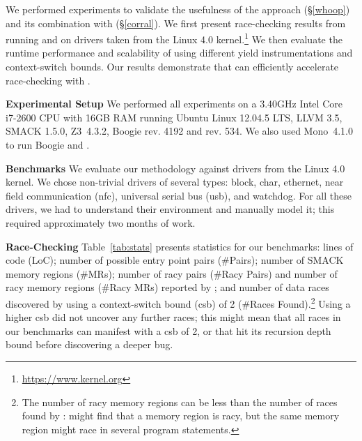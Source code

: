 We performed experiments to validate the usefulness of the \whoop approach (\S\ref{whoop}) and its combination with \corral (\S\ref{corral}). We first present race-checking results from running \whoop and \corral on \sizeOfBenchmarks drivers taken from the Linux 4.0 kernel.\footnote{\url{https://www.kernel.org}} We then evaluate the runtime performance and scalability of \corral using different yield instrumentations and context-switch bounds. Our results demonstrate that \whoop can efficiently accelerate race-checking with \corral.



\noindent\textbf{Experimental Setup }
%
We performed all experiments on a 3.40GHz Intel Core i7-2600 CPU with 16GB RAM running Ubuntu Linux 12.04.5 LTS, LLVM 3.5, SMACK 1.5.0, Z3~4.3.2, Boogie rev. 4192 and \corral rev. 534. We also used Mono~4.1.0 to run Boogie and \corral.

\noindent\textbf{Benchmarks }
%
We evaluate our methodology against \sizeOfBenchmarks drivers from the Linux 4.0 kernel. We chose non-trivial drivers of several types: block, char, ethernet, near field communication (nfc), universal serial bus (usb), and watchdog. For all these drivers, we had to understand their environment and manually model it; this required approximately two months of work.

\noindent\textbf{Race-Checking }
%
Table~\ref{tab:stats} presents statistics for our benchmarks: lines of code (LoC); number of possible entry point pairs (\#Pairs); number of SMACK memory regions (\#MRs); number of racy pairs (\#Racy Pairs) and number of racy memory regions (\#Racy MRs) reported by \whoop; and number of data races discovered by \corral using a context-switch bound (csb) of 2 (\#Races Found).\footnote{The number of racy memory regions can be less than the number of races found by \corral: \whoop might find that a memory region is racy, but the same memory region might race in several program statements.} Using a higher csb did not uncover any further races; this might mean that all races in our benchmarks can manifest with a csb of 2, or that \corral hit its recursion depth bound before discovering a deeper bug.

